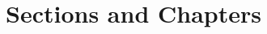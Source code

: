 \documentclass[a4paper,12pt]{article}
\title{Sections and Chapters}
\begin{document}
	
	\maketitle
	\tableofcontents
	\begin{onehalfspace}
		\newpage
		
		\newpage
		
		
	\end{onehalfspace}
\printbibliography %
\end{document}
